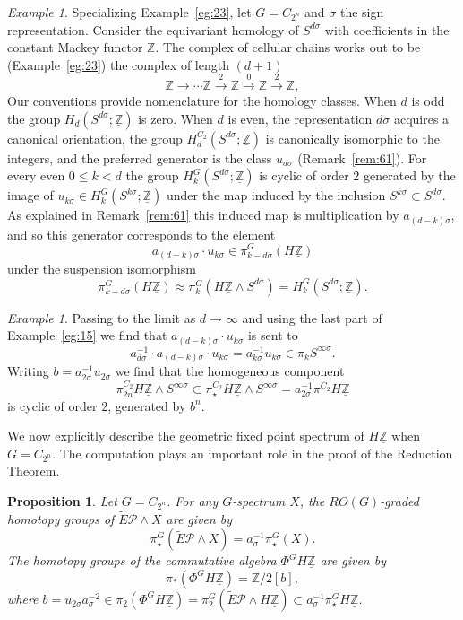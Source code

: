 \documentclass{amsart}
\newtheorem{prop}[equation]{Proposition}
\theoremstyle{definition}
\theoremstyle{remark}
\newtheorem{eg}[equation]{Example}
\newcommand{\Z}{{\mathbb Z}}
\newcommand{\tg}[1]{\tilde{E}#1}
\newcommand{\gfp}[1]{\Phi^{#1}}
\newcommand{\phig}{\gfp{G}}
\newcommand{\Zm}{\underline{\Z}}
\newcommand{\zt}{C_{2}}
\newcommand{\ztn}{C_{2^{n}}}
\newcommand{\pfamily}{\mathcal P}
\newcommand{\tgp}{\tg{\pfamily}}
\begin{document}
\begin{eg}
\label{eg:20} Specializing Example~\ref{eg:23}, let $G=\ztn$ and
$\sigma$ the sign representation.  Consider the equivariant homology
of $S^{d\sigma}$ with coefficients in the constant Mackey functor
$\Z$.  The complex of cellular chains works out to be
(Example~\ref{eg:23}) the complex of length $(d+1)$
\[
\Z\xrightarrow{\phantom{2}}{}\cdots
\Z\xrightarrow{2}{}\Z\xrightarrow{0}{} \Z\xrightarrow{2}{}\Z,
\]
Our conventions provide nomenclature for the homology classes.  When
$d$ is odd the group $H_{d}(S^{d\sigma};\Zm)$ is zero.  When $d$ is
even, the representation $d\sigma$ acquires a canonical orientation,
the group $H_{d}^{\zt}(S^{d\sigma};\Zm)$ is canonically isomorphic to
the integers, and the preferred generator is the class $u_{d\sigma}$
(Remark~\ref{rem:61}).  For every even $0\le k < d$ the group
$H^{G}_{k}(S^{d\sigma};\Zm)$ is cyclic of order $2$ generated by the
image of $u_{k\sigma}\in H^{G}_{k}(S^{k\sigma};\Zm)$ under the map
induced by the inclusion $S^{k\sigma}\subset S^{d\sigma}$.  As
explained in Remark~\ref{rem:61} this induced map is multiplication by
$a_{(d-k)\sigma}$, and so this generator corresponds to the element
\[
a_{(d-k)\sigma}\cdot u_{k\sigma}\in \pi^{G}_{k - d\sigma}(H\Zm)
\]
under the suspension isomorphism 
\[
\pi^{G}_{k - d\sigma}(H\Zm)  \approx
\pi^{G}_{k}(H\Zm\wedge S^{d\sigma}) = H^{G}_{k}(S^{d\sigma};\Zm).
\]
\end{eg}

\begin{eg}
\label{eg:24}
Passing to the limit as $d\to\infty$ and using the last part of
Example~\ref{eg:15} we find that $a_{(d-k)\sigma}\cdot u_{k\sigma}$ is
sent to 
\[
a_{d\sigma}^{-1}\cdot a_{(d-k)\sigma}\cdot u_{k\sigma} =
a_{k\sigma}^{-1}u_{k\sigma}\in \pi_{k}S^{\infty \sigma}.
\]
Writing $b=a_{2\sigma}^{-1}u_{2\sigma}$ we find that the homogeneous
component 
\[
\pi^{\zt}_{2n}H\Zm \wedge S^{\infty \sigma}\subset \pi^{\zt}_{\star}H\Zm
\wedge S^{\infty \sigma}= a_{2\sigma}^{-1}\pi^{\zt}H\Zm
\]
is cyclic of order $2$, generated by
$b^{n}$.
\end{eg}

We now explicitly describe the geometric fixed point spectrum of
$H\Zm$ when $G=\ztn$.  The computation plays an important role in the
proof of the Reduction Theorem.

\begin{prop}
\label{thm:94}
Let $G=\ztn$.  For any $G$-spectrum $X$, the $RO(G)$-graded
homotopy groups of $\tgp\wedge X$ are given by
\[
\pi^{G}_{\star}(\tgp\wedge  X) = a_{\sigma}^{-1} \pi^{G}_{\star} (X).
\]
The homotopy groups of the commutative algebra $\phig H\Zm$ are given
by
\[
\pi_{\ast}(\phig H\Zm)=\Z/2[b],
\]
where $b=u_{2\sigma}a_{\sigma}^{-2}\in\pi_{2}(\phig H\Zm)
=\pi^{G}_{2}(\tgp \wedge H\Zm)\subset a_{\sigma}^{-1} \pi^{G}_{\star}
H\Zm$.
\end{prop}
\end{document}
